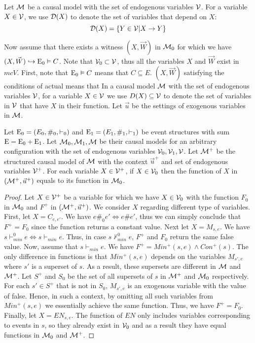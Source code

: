 \begin{notion}
    Let $\mathcal{M}$ be a causal model with the set of endogenous variables $\mathcal{V}$.
    For a variable $X \in \mathcal{V}$, we use $\mathcal{D}(X)$ to denote the set of
    variables that depend on $X$:
    \begin{equation*}
        \mathcal{D}(X) = \{Y \in \mathcal{V} | X \to Y \}
    \end{equation*}
\end{notion}
Now assume that there exists a witness $(X,\vec W)$ in $\mathcal{M}_0$ for
which we have $(X,\vec W) \hookrightarrow \mathrm{E}_0 \vDash C$.
Note that $\mathcal{V}_0 \subset \mathcal{V}$, thus all the variables $X$ and
$\vec W$ exist in $mc{V}$.
First, note that $\mathrm{E}_0 \vDash C$ means that $C \subseteq E$.
$(X,\vec W)$ satisfying the conditions of actual means that
In a causal model $\mathcal{M}$ with the set of endogenous variables
$\mathcal{V}$, for a variable $X \in \mathcal{V}$ we use $D(X) \subseteq \mathcal{V}$
to denote the set of variables in $\mathcal{V}$ that have $X$ in their function.
Let $\vec u$ be the settings of exogenous variables in $\mathcal{M}$.

\begin{lemma}
    Let $\mathrm{E}_0 = (E_0,\#_0,\vdash_0)$ and $\mathrm{E}_1 = (E_1,\#_1,\vdash_1)$
    be event structures with sum $\mathrm{E} = \mathrm{E}_0 + \mathrm{E}_1$.
    Let $\mathcal{M}_0,\mathcal{M}_1,\mathcal{M}$ be their causal models for an arbitrary
    configuration with the set of endogenous variables $\mathcal{V}_0,\mathcal{V}_1,\mathcal{V}$.
    Let $\mathcal{M}^+$ be the structured causal model of $\mathcal{M}$ with the context
    $\vec u^+$ and set of endogenous variables $\mathcal{V}^+$.
    For each variable $X \in \mathcal{V}^+$, if $X \in \mathcal{V}_0$
    then the function of $X$ in $(\mathcal{M}^+,\vec u^+)$ equals to its function in $\mathcal{M}_0$.
\end{lemma}

\begin{proof}
    Let $X \in \mathcal{V}^+$ be a variable for which we have $X \in \mathcal{V}_0$ with the
    function $F_0$ in $\mathcal{M}_0$ and $F^+$ in $(\mathcal{M}^+,\vec u^+)$.
    We consider $X$ regarding different type of variables.
    First, let $X = C_{e,e'}$.
    We have $e\#_0e' \iff e\#e'$, thus we can simply
    conclude that $F^+ = F_0$ since the function returns a constant value.
    Next let $X = M_{s,e}$.
    We have $s \vdash_{min}^0 e \iff s \vdash_{min} e$.
    Thus, in case $s \not \vdash_{min}^0 e$, $F^+$ and
    $F_0$ return the same false value.
    Now, assume that $s \vdash_{min} e$.
    We have $F^+ = Min^+(s,e) \wedge Con^+(s)$.
    The only difference in functions is that $Min^+(s,e)$
    depends on the variables $M_{s',e}$ where
    $s'$ is a superset of $s$.
    As a result, these supersets are different in $\mathcal{M}$ and $\mathcal{M}^+$.
    Let $S^+$ and $S_0$ be the set of all supersets of $s$ in $\mathcal{M}^+$ and $\mathcal{M}_0$
    respectively.
    For each $s' \in S^+$ that is not in $S_0$, $M_{s',e}$ is an exogenous
    variable with the value of false.
    Hence, in such a context, by omitting all such variables from
    $Min^+(s,e)$ we essentially achieve the same function.
    Thus, we have $F^+ = F_0$.
    Finally, let $X = EN_{s,e}$.
    The function of $EN$ only includes variables corresponding to events in
    $s$, so they already exist in $\mathcal{V}_0$ and as a result they have equal
    functions in $\mathcal{M}_0$ and $\mathcal{M}^+$.
\end{proof}

